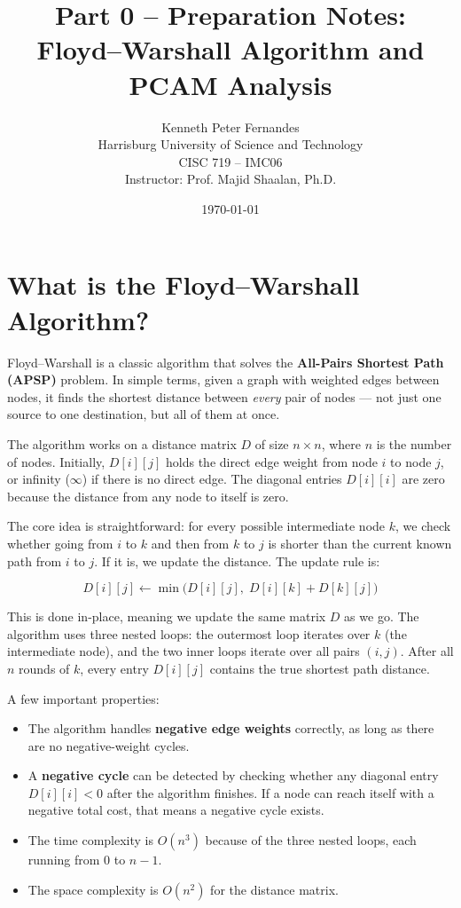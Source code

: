 \documentclass[11pt]{article}
\title{Part 0 -- Preparation Notes:\\Floyd--Warshall Algorithm and PCAM Analysis}
\author{Kenneth Peter Fernandes\\Harrisburg University of Science and Technology\\CISC 719 -- IMC06\\Instructor: Prof. Majid Shaalan, Ph.D.}
\date{\today}
\begin{document}
\maketitle

\section{What is the Floyd--Warshall Algorithm?}

Floyd--Warshall is a classic algorithm that solves the \textbf{All-Pairs Shortest Path (APSP)} problem. In simple terms, given a graph with weighted edges between nodes, it finds the shortest distance between \emph{every} pair of nodes --- not just one source to one destination, but all of them at once.

The algorithm works on a distance matrix $D$ of size $n \times n$, where $n$ is the number of nodes. Initially, $D[i][j]$ holds the direct edge weight from node $i$ to node $j$, or infinity ($\infty$) if there is no direct edge. The diagonal entries $D[i][i]$ are zero because the distance from any node to itself is zero.

The core idea is straightforward: for every possible intermediate node $k$, we check whether going from $i$ to $k$ and then from $k$ to $j$ is shorter than the current known path from $i$ to $j$. If it is, we update the distance. The update rule is:

\[
D[i][j] \leftarrow \min\bigl(D[i][j],\; D[i][k] + D[k][j]\bigr)
\]

This is done in-place, meaning we update the same matrix $D$ as we go. The algorithm uses three nested loops: the outermost loop iterates over $k$ (the intermediate node), and the two inner loops iterate over all pairs $(i, j)$. After all $n$ rounds of $k$, every entry $D[i][j]$ contains the true shortest path distance.

A few important properties:
\begin{itemize}
  \item The algorithm handles \textbf{negative edge weights} correctly, as long as there are no negative-weight cycles.
  \item A \textbf{negative cycle} can be detected by checking whether any diagonal entry $D[i][i] < 0$ after the algorithm finishes. If a node can reach itself with a negative total cost, that means a negative cycle exists.
  \item The time complexity is $O(n^3)$ because of the three nested loops, each running from $0$ to $n-1$.
  \item The space complexity is $O(n^2)$ for the distance matrix.
\end{itemize}
\end{document}
